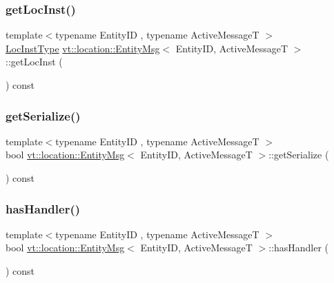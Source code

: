 \subsubsection{\texorpdfstring{get\+Loc\+Inst()}{getLocInst()}}
{\footnotesize\ttfamily template$<$typename Entity\+ID , typename Active\+MessageT $>$ \\
\hyperlink{namespacevt_1_1location_a4db6456e8024af2d23fc5ae560fef866}{Loc\+Inst\+Type} \hyperlink{structvt_1_1location_1_1_entity_msg}{vt\+::location\+::\+Entity\+Msg}$<$ Entity\+ID, Active\+MessageT $>$\+::get\+Loc\+Inst (\begin{DoxyParamCaption}{ }\end{DoxyParamCaption}) const\hspace{0.3cm}{\ttfamily [inline]}}

\mbox{\label{structvt_1_1location_1_1_entity_msg_a0dc24a126251cb00a1e44b19eeb9208e}} 
\subsubsection{\texorpdfstring{get\+Serialize()}{getSerialize()}}
{\footnotesize\ttfamily template$<$typename Entity\+ID , typename Active\+MessageT $>$ \\
bool \hyperlink{structvt_1_1location_1_1_entity_msg}{vt\+::location\+::\+Entity\+Msg}$<$ Entity\+ID, Active\+MessageT $>$\+::get\+Serialize (\begin{DoxyParamCaption}{ }\end{DoxyParamCaption}) const\hspace{0.3cm}{\ttfamily [inline]}}

\mbox{\label{structvt_1_1location_1_1_entity_msg_a0796bd63248dae2b457aa2eedc345743}} 
\subsubsection{\texorpdfstring{has\+Handler()}{hasHandler()}}
{\footnotesize\ttfamily template$<$typename Entity\+ID , typename Active\+MessageT $>$ \\
bool \hyperlink{structvt_1_1location_1_1_entity_msg}{vt\+::location\+::\+Entity\+Msg}$<$ Entity\+ID, Active\+MessageT $>$\+::has\+Handler (\begin{DoxyParamCaption}{ }\end{DoxyParamCaption}) const\hspace{0.3cm}{\ttfamily [inline]}}

